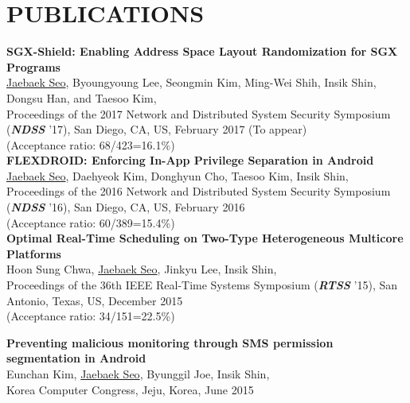 \section{PUBLICATIONS}
   \vspace{0.1in}


    \textbf{SGX-Shield: Enabling Address Space Layout Randomization for SGX Programs}\\
    \underline{Jaebaek Seo}, Byoungyoung Lee, Seongmin Kim, Ming-Wei Shih,
    Insik Shin, Dongsu Han, and Taesoo Kim,\\
    Proceedings of the 2017 Network and Distributed System Security Symposium (\emph{\textbf{NDSS}} '17),
    San Diego, CA, US, February 2017 (To appear)\\
    {\small(Acceptance ratio: 68/423=16.1\%)}\\

    \textbf{FLEXDROID: Enforcing In-App Privilege Separation in Android}\\
    \underline{Jaebaek Seo}, Daehyeok Kim, Donghyun Cho, Taesoo Kim, Insik Shin,\\
    Proceedings of the 2016 Network and Distributed System Security Symposium (\emph{\textbf{NDSS}} '16),
    San Diego, CA, US, February 2016\\
    {\small(Acceptance ratio: 60/389=15.4\%)}\\

    \textbf{Optimal Real-Time Scheduling on Two-Type Heterogeneous Multicore Platforms}\\
    Hoon Sung Chwa, \underline{Jaebaek Seo}, Jinkyu Lee, Insik Shin,\\
    Proceedings of the 36th IEEE Real-Time Systems Symposium (\emph{\textbf{RTSS}} '15),
    San Antonio, Texas, US, December 2015\\
    {\small(Acceptance ratio: 34/151=22.5\%)}

    \textbf{Preventing malicious monitoring through SMS permission segmentation in Android}\\
    Eunchan Kim, \underline{Jaebaek Seo}, Byunggil Joe, Insik Shin,\\
    Korea Computer Congress, Jeju, Korea, June 2015
